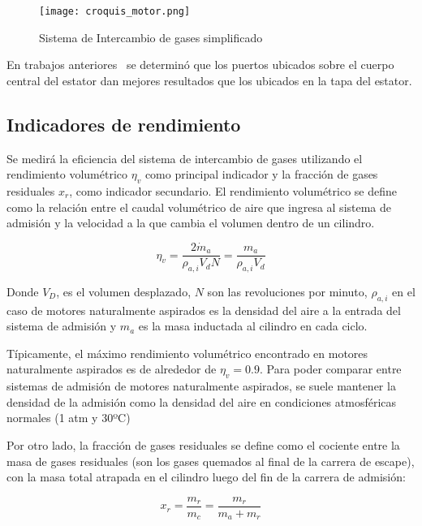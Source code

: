 \begin{figure}
    \centering
    \texttt{[image: croquis\_motor.png]}
    \caption{Sistema de Intercambio de gases simplificado}\label{fig:croquis_mrcvc}
\end{figure}

En trabajos anteriores~\parencite{mrcvc_geom} se determinó que los puertos
ubicados sobre el cuerpo central del estator  dan mejores resultados que los
ubicados en la tapa del estator.

\subsection{Indicadores de rendimiento}\label{sec:indicadores_rendimiento}

Se medirá la eficiencia del sistema de intercambio de gases utilizando el
rendimiento volumétrico $\eta_v$ como principal indicador y la fracción de
gases residuales $x_r$, como indicador secundario.
%
El rendimiento volumétrico se define como la relación entre el caudal
volumétrico de aire que ingresa al sistema de admisión y la velocidad a la que
cambia el volumen dentro de un cilindro.
%

\begin{equation}\label{eq:rendVol}
  \eta_v = \frac{2 \dot{m}_a}{\rho_{a,i} V_d N} = \frac{m_a}{\rho_{a,i} V_d}
\end{equation}

Donde $V_D$, es el volumen desplazado, $N$ son las revoluciones por minuto,
$\rho_{a,i}$ en el caso de motores naturalmente aspirados es la densidad del
aire a la entrada del sistema de admisión y $m_a$ es la masa inductada al
cilindro en cada ciclo.

Típicamente, el máximo rendimiento volumétrico encontrado en motores
naturalmente aspirados es de alrededor de $\eta_v = 0.9$.
%
Para poder comparar entre sistemas de admisión de motores naturalmente
aspirados, se suele mantener la densidad de la admisión como la densidad del
aire en condiciones atmosféricas normales (1 atm y 30ºC) 

Por otro lado, la fracción de gases residuales se define como el cociente entre
la masa de gases residuales (son los gases quemados al final de la carrera de
escape), con la masa total atrapada en el cilindro luego del fin de la carrera
de admisión:

\begin{equation}\label{eq:fracRes}
    x_r = \frac{m_r}{m_c} = \frac{m_r}{m_a + m_r} 
\end{equation}

